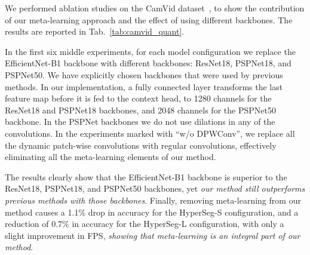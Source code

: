 \documentclass[final]{cvpr}
\newcommand{\minisection}[1]{\vspace{2mm}\noindent{\textbf{#1}.}}
\begin{document}
\minisection{Ablation Study}
We performed ablation studies on the CamVid dataset~\cite{brostow2009semantic}, to show the contribution of our meta-learning approach and the effect of using different backbones. The results are reported in Tab.~\ref{tab:camvid_quant}.

In the first six middle experiments, for each model configuration we replace the EfficientNet-B1 backbone with different backbones: ResNet18, PSPNet18, and PSPNet50. We have explicitly chosen backbones that were used by previous methods. In our implementation, a fully connected layer transforms the last feature map before it is fed to the context head, to 1280 channels for the ResNet18 and PSPNet18 backbones, and 2048 channels for the PSPNet50 backbone. In the PSPNet backbones we do not use dilations in any of the convolutions. In the experiments marked with ``w/o DPWConv'', we replace all the dynamic patch-wise convolutions with regular convolutions, effectively eliminating all the meta-learning elements of our method.

The results clearly show that the EfficientNet-B1 backbone is superior to the ResNet18, PSPNet18, and PSPNet50 backbones, yet {\em our method still outperforms previous methods with those backbones}. Finally, removing meta-learning from our method causes a 1.1\% drop in accuracy for the HyperSeg-S configuration, and a reduction of 0.7\% in accuracy for the HyperSeg-L configuration, with only a slight improvement in FPS, {\em showing that meta-learning is an integral part of our method}.
\end{document}
